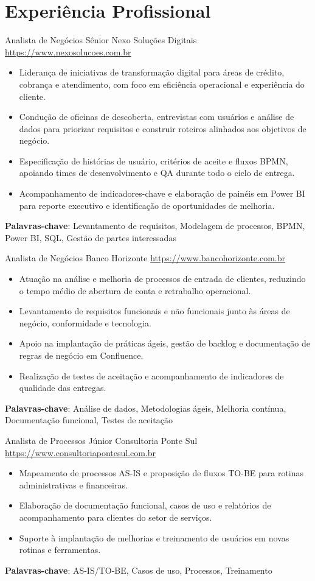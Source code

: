 \documentclass[a4paper, serif, 10pt]{moderncv}
\begin{document}
\section{Experiência Profissional}

        {Analista de Negócios Sênior}
        {Nexo Soluções Digitais}
        {\url{https://www.nexosolucoes.com.br}}
        {}
        {\begin{itemize}
\item Liderança de iniciativas de transformação digital para áreas de crédito, cobrança e atendimento, com foco em eficiência operacional e experiência do cliente.
\item Condução de oficinas de descoberta, entrevistas com usuários e análise de dados para priorizar requisitos e construir roteiros alinhados aos objetivos de negócio.
\item Especificação de histórias de usuário, critérios de aceite e fluxos BPMN, apoiando times de desenvolvimento e QA durante todo o ciclo de entrega.
\item Acompanhamento de indicadores-chave e elaboração de painéis em Power BI para reporte executivo e identificação de oportunidades de melhoria.
\end{itemize}
\textbf{Palavras-chave}: Levantamento de requisitos, Modelagem de processos, BPMN, Power BI, SQL, Gestão de partes interessadas}

        {Analista de Negócios}
        {Banco Horizonte}
        {\url{https://www.bancohorizonte.com.br}}
        {}
        {\begin{itemize}
\item Atuação na análise e melhoria de processos de entrada de clientes, reduzindo o tempo médio de abertura de conta e retrabalho operacional.
\item Levantamento de requisitos funcionais e não funcionais junto às áreas de negócio, conformidade e tecnologia.
\item Apoio na implantação de práticas ágeis, gestão de backlog e documentação de regras de negócio em Confluence.
\item Realização de testes de aceitação e acompanhamento de indicadores de qualidade das entregas.
\end{itemize}
\textbf{Palavras-chave}: Análise de dados, Metodologias ágeis, Melhoria contínua, Documentação funcional, Testes de aceitação}

        {Analista de Processos Júnior}
        {Consultoria Ponte Sul}
        {\url{https://www.consultoriapontesul.com.br}}
        {}
        {\begin{itemize}
\item Mapeamento de processos AS-IS e proposição de fluxos TO-BE para rotinas administrativas e financeiras.
\item Elaboração de documentação funcional, casos de uso e relatórios de acompanhamento para clientes do setor de serviços.
\item Suporte à implantação de melhorias e treinamento de usuários em novas rotinas e ferramentas.
\end{itemize}
\textbf{Palavras-chave}: AS-IS/TO-BE, Casos de uso, Processos, Treinamento}
\end{document}
